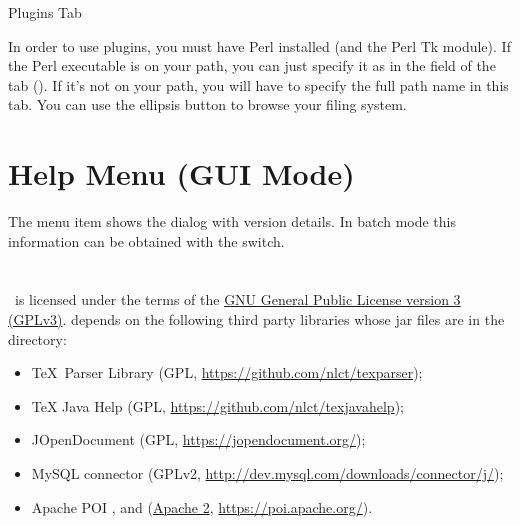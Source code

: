 
 {%
 }
 {Plugins Tab}

In order to use  plugins, you must have Perl installed (and the
Perl Tk module). If the Perl executable is on your path, you can just
specify it as  in the 
field of the  tab (). If it's not on your
path, you will have to specify the full path name in this tab. You can
use the ellipsis button to browse your filing system.

\chapter{Help Menu (GUI Mode)}
\label{sec:helpwindows}


The  menu item shows the 
dialog with version details. In batch mode this information can be
obtained with the  switch.




\chapter{}
\label{sec:licence}

   \appname\ is licensed under the terms of the 
   \href{https://www.gnu.org/licenses/gpl-3.0.html}{GNU General
   Public License version 3 (GPLv3)}.
    depends on the following third party libraries whose jar files are
   in the  directory:
   \begin{itemize}
   \item \TeX\ Parser Library 
   (GPL, \url{https://github.com/nlct/texparser});
   \item TeX Java Help 
   (GPL, \url{https://github.com/nlct/texjavahelp});
   \item JOpenDocument 
     (GPL, \url{https://jopendocument.org/});
   \item MySQL connector 
     (GPLv2, \url{http://dev.mysql.com/downloads/connector/j/});
   \item Apache POI , 
   and 
    (\href{https://www.apache.org/licenses/LICENSE-2.0.html}{Apache 2}, \url{https://poi.apache.org/}).
   \end{itemize}



\printmain
\printindex


